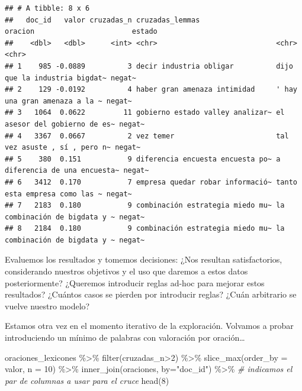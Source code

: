 \documentclass[
]{book}
\newenvironment{Shaded}{\begin{snugshade}}{\end{snugshade}}
\newcommand{\AttributeTok}[1]{\textcolor[rgb]{0.77,0.63,0.00}{#1}}
\newcommand{\CommentTok}[1]{\textcolor[rgb]{0.56,0.35,0.01}{\textit{#1}}}
\newcommand{\DecValTok}[1]{\textcolor[rgb]{0.00,0.00,0.81}{#1}}
\newcommand{\FunctionTok}[1]{\textcolor[rgb]{0.00,0.00,0.00}{#1}}
\newcommand{\NormalTok}[1]{#1}
\newcommand{\SpecialCharTok}[1]{\textcolor[rgb]{0.00,0.00,0.00}{#1}}
\newcommand{\StringTok}[1]{\textcolor[rgb]{0.31,0.60,0.02}{#1}}
\begin{document}
\begin{verbatim}
## # A tibble: 8 x 6
##   doc_id   valor cruzadas_n cruzadas_lemmas                  oracion                       estado
##    <dbl>   <dbl>      <int> <chr>                            <chr>                         <chr> 
## 1    985 -0.0889          3 decir industria obligar          dijo que la industria bigdat~ negat~
## 2    129 -0.0192          4 haber gran amenaza intimidad     ' hay una gran amenaza a la ~ negat~
## 3   1064  0.0622         11 gobierno estado valley analizar~ el asesor del gobierno de es~ negat~
## 4   3367  0.0667          2 vez temer                        tal vez asuste , sí , pero n~ negat~
## 5    380  0.151           9 diferencia encuesta encuesta po~ a diferencia de una encuesta~ negat~
## 6   3412  0.170           7 empresa quedar robar informació~ tanto esta empresa como las ~ negat~
## 7   2183  0.180           9 combinación estrategia miedo mu~ la combinación de bigdata y ~ negat~
## 8   2184  0.180           9 combinación estrategia miedo mu~ la combinación de bigdata y ~ negat~
\end{verbatim}

Evaluemos los resultados y tomemos decisiones: ¿Nos resultan satisfactorios, considerando nuestros objetivos y el uso que daremos a estos datos posteriormente? ¿Queremos introducir reglas ad-hoc para mejorar estos resultados? ¿Cuántos casos se pierden por introducir reglas? ¿Cuán arbitrario se vuelve nuestro modelo?

Estamos otra vez en el momento iterativo de la exploración. Volvamos a probar introduciendo un mínimo de palabras con valoración por oración\ldots{}

\begin{Shaded}
\begin{Highlighting}[]
\NormalTok{oraciones\_lexicones }\SpecialCharTok{\%\textgreater{}\%}
  \FunctionTok{filter}\NormalTok{(cruzadas\_n}\SpecialCharTok{\textgreater{}}\DecValTok{2}\NormalTok{) }\SpecialCharTok{\%\textgreater{}\%}
  \FunctionTok{slice\_max}\NormalTok{(}\AttributeTok{order\_by =}\NormalTok{ valor, }\AttributeTok{n =} \DecValTok{10}\NormalTok{) }\SpecialCharTok{\%\textgreater{}\%}
  \FunctionTok{inner\_join}\NormalTok{(oraciones, }\AttributeTok{by=}\StringTok{"doc\_id"}\NormalTok{) }\SpecialCharTok{\%\textgreater{}\%} \CommentTok{\# indicamos el par de columnas a usar para el cruce}
  \FunctionTok{head}\NormalTok{(}\DecValTok{8}\NormalTok{)}
\end{Highlighting}
\end{Shaded}
\end{document}
